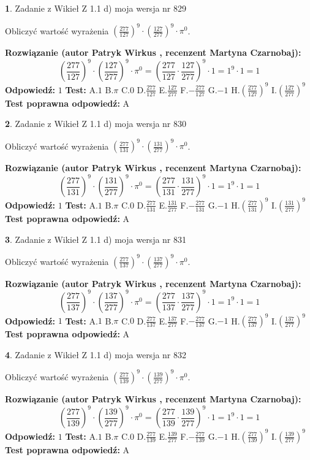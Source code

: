 \documentclass[12pt, a4paper]{article}
\theoremstyle{definition} %
\newtheorem{zad}{}
\newcommand{\zadStart}[1]{\begin{zad}#1\newline}
\newcommand{\zadStop}{\end{zad}}
\newcommand{\rozwStart}[2]{\noindent \textbf{Rozwiązanie (autor #1 , recenzent #2): }\newline}
\newcommand{\rozwStop}{\newline}
\newcommand{\odpStart}{\noindent \textbf{Odpowiedź:}\newline}
\newcommand{\odpStop}{\newline}
\newcommand{\testStart}{\noindent \textbf{Test:}\newline}
\newcommand{\testStop}{\newline}
\newcommand{\kluczStart}{\noindent \textbf{Test poprawna odpowiedź:}\newline}
\newcommand{\kluczStop}{\newline}
\begin{document}
\zadStart{Zadanie z Wikieł Z 1.1 d) moja wersja nr 829}

Obliczyć wartość wyrażenia $(\frac{277}{127})^{9} \cdot (\frac{127}{277})^{9} \cdot \pi^{0}$.
\zadStop
\rozwStart{Patryk Wirkus}{Martyna Czarnobaj}
$$(\frac{277}{127})^{9} \cdot (\frac{127}{277})^{9} \cdot \pi^{0} = (\frac{277}{127} \cdot \frac{127}{277})^{9} \cdot 1 = 1^{9} \cdot 1 = 1$$
\rozwStop
\odpStart
$1$
\odpStop
\testStart
A.$1$ B.$\pi$ C.$0$ D.$\frac{277}{127}$ E.$\frac{127}{277}$
F.$-\frac{277}{127}$ G.$-1$
H.$(\frac{277}{127})^{9}$
I.$(\frac{127}{277})^{9}$
\testStop
\kluczStart
A
\kluczStop



\zadStart{Zadanie z Wikieł Z 1.1 d) moja wersja nr 830}

Obliczyć wartość wyrażenia $(\frac{277}{131})^{9} \cdot (\frac{131}{277})^{9} \cdot \pi^{0}$.
\zadStop
\rozwStart{Patryk Wirkus}{Martyna Czarnobaj}
$$(\frac{277}{131})^{9} \cdot (\frac{131}{277})^{9} \cdot \pi^{0} = (\frac{277}{131} \cdot \frac{131}{277})^{9} \cdot 1 = 1^{9} \cdot 1 = 1$$
\rozwStop
\odpStart
$1$
\odpStop
\testStart
A.$1$ B.$\pi$ C.$0$ D.$\frac{277}{131}$ E.$\frac{131}{277}$
F.$-\frac{277}{131}$ G.$-1$
H.$(\frac{277}{131})^{9}$
I.$(\frac{131}{277})^{9}$
\testStop
\kluczStart
A
\kluczStop



\zadStart{Zadanie z Wikieł Z 1.1 d) moja wersja nr 831}

Obliczyć wartość wyrażenia $(\frac{277}{137})^{9} \cdot (\frac{137}{277})^{9} \cdot \pi^{0}$.
\zadStop
\rozwStart{Patryk Wirkus}{Martyna Czarnobaj}
$$(\frac{277}{137})^{9} \cdot (\frac{137}{277})^{9} \cdot \pi^{0} = (\frac{277}{137} \cdot \frac{137}{277})^{9} \cdot 1 = 1^{9} \cdot 1 = 1$$
\rozwStop
\odpStart
$1$
\odpStop
\testStart
A.$1$ B.$\pi$ C.$0$ D.$\frac{277}{137}$ E.$\frac{137}{277}$
F.$-\frac{277}{137}$ G.$-1$
H.$(\frac{277}{137})^{9}$
I.$(\frac{137}{277})^{9}$
\testStop
\kluczStart
A
\kluczStop



\zadStart{Zadanie z Wikieł Z 1.1 d) moja wersja nr 832}

Obliczyć wartość wyrażenia $(\frac{277}{139})^{9} \cdot (\frac{139}{277})^{9} \cdot \pi^{0}$.
\zadStop
\rozwStart{Patryk Wirkus}{Martyna Czarnobaj}
$$(\frac{277}{139})^{9} \cdot (\frac{139}{277})^{9} \cdot \pi^{0} = (\frac{277}{139} \cdot \frac{139}{277})^{9} \cdot 1 = 1^{9} \cdot 1 = 1$$
\rozwStop
\odpStart
$1$
\odpStop
\testStart
A.$1$ B.$\pi$ C.$0$ D.$\frac{277}{139}$ E.$\frac{139}{277}$
F.$-\frac{277}{139}$ G.$-1$
H.$(\frac{277}{139})^{9}$
I.$(\frac{139}{277})^{9}$
\testStop
\kluczStart
A
\kluczStop
\end{document}
